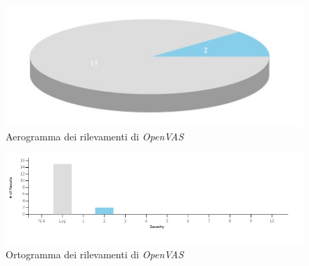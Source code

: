 \begin{figure}[h]
    \centering
    \includegraphics[scale=0.5]{capitoli/images/openvas-chart1.jpeg}
    \caption{Aerogramma dei rilevamenti di \emph{OpenVAS}}
    \label{fig:openvas_chart1}
\end{figure}
\begin{figure}[h]
    \centering
    \includegraphics[scale=0.3]{capitoli/images/openvas-chart2.png}
    \caption{Ortogramma dei rilevamenti di \emph{OpenVAS}}
    \label{fig:openvas_chart2}
\end{figure}
